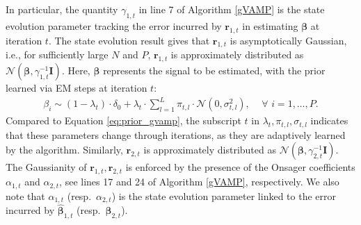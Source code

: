 In particular, the quantity $\gamma_{1,t}$ in line 7 of Algorithm \ref{gVAMP} is the state evolution parameter tracking the error incurred by $\bm r_{1, t}$ in estimating $\bm\beta$ at iteration $t$. The state evolution result gives that $\bm{r}_{1,t}$ is asymptotically Gaussian, i.e., for sufficiently large $N$ and $P$, $\bm{r}_{1,t}$ is approximately distributed as $\mathcal{N}(\bm{\beta}, \gamma_{1,t}^{-1} \bm{I})$. Here, $\bm{\beta}$ represents the signal to be estimated, with the prior learned via EM steps at iteration $t$: 
\begin{align}
    \beta_i \sim (1-\lambda_t) \cdot \delta_0 + \lambda_t \cdot \sum^{L}_{l=1} \pi_{t, l} \cdot \mathcal{N}(0, \sigma_{t, l}^2), \quad \,\forall \,\, i = 1, \dots, P.
\end{align}
Compared to Equation \eqref{eq:prior_gvamp}, the subscript $t$ in $\lambda_t, \pi_{t, l}, \sigma_{t, l}$ indicates that these parameters change through iterations, as they are adaptively learned by the algorithm.
Similarly, $\bm{r}_{2,t}$ is approximately distributed as $\mathcal{N}(\bm{\beta}, \gamma_{2,t}^{-1} \bm{I})$. The Gaussianity of $\bm{r}_{1,t}, \bm{r}_{2,t}$ is enforced by the presence of the Onsager coefficients $\alpha_{1,t}$ and $\alpha_{2,t}$, see lines 17 and 24 of Algorithm \ref{gVAMP}, respectively. We also note that  $\alpha_{1,t}$ (resp.\ $\alpha_{2,t}$) is the state evolution parameter linked to the error incurred by $\hat{\bm \beta}_{1, t}$ (resp.\ $\hat{\bm \beta}_{2, t}$).


